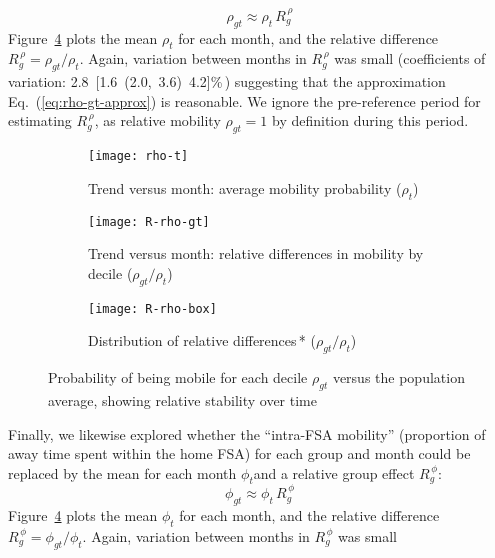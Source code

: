 \begin{equation}\label{eq:rho-gt-approx}
  \rho_{gt} \approx \rho_{t}\,R^{\,\rho}_{g}
\end{equation}
Figure~\ref{fig:rho} plots the mean $\rho_{t}$ for each month,
and the relative difference $R^{\,\rho}_{g} = \rho_{gt} / \rho_{t}$.
Again, variation between months in $R^{\,\rho}_{g}$ was small
(coefficients of variation: 2.8~[1.6~(2.0,~3.6)~4.2]\%\,)
suggesting that the approximation Eq.~(\ref{eq:rho-gt-approx}) is reasonable.
We ignore the pre-\covid reference period for estimating $R^{\,\rho}_{g}$,
as relative mobility $\rho_{gt} = 1$ by definition during this period.
\begin{figure}[ht]
  \begin{subfigure}[t]{0.297\linewidth}
    \texttt{[image: rho-t]}
    \caption{Trend versus month: average mobility probability ($\rho_{t}$)}
    \label{fig:rho-t}
  \end{subfigure}\hfill
  \begin{subfigure}[t]{0.33\linewidth}
    \texttt{[image: R-rho-gt]}
    \caption{Trend versus month: relative differences in mobility by decile ($\rho_{gt} / \rho_{t}$)}
    \label{fig:rho-gt}
  \end{subfigure}\hfill
  \begin{subfigure}[t]{0.33\linewidth}
    \texttt{[image: R-rho-box]}
    \caption{Distribution of relative differences\,* ($\rho_{gt} / \rho_{t}$)}
    \label{fig:rho-box}
  \end{subfigure}
  \caption{Probability of being mobile for each decile $\rho_{gt}$
    versus the population average,
    showing relative stability over time}
  \label{fig:rho}
\end{figure}
\par
Finally, we likewise explored whether the ``intra-FSA mobility''
(proportion of away time spent within the home FSA)
for each group and month could be replaced by
the mean for each month $\phi_{t}$and a relative group effect $R^{\,\phi}_{g}$:
\begin{equation}\label{eq:phi-gt-approx}
  \phi_{gt} \approx \phi_{t}\,R^{\,\phi}_{g}
\end{equation}
Figure~\ref{fig:rho} plots the mean $\phi_{t}$ for each month,
and the relative difference $R^{\,\phi}_{g} = \phi_{gt} / \phi_{t}$.
Again, variation between months in $R^{\,\phi}_{g}$ was small
